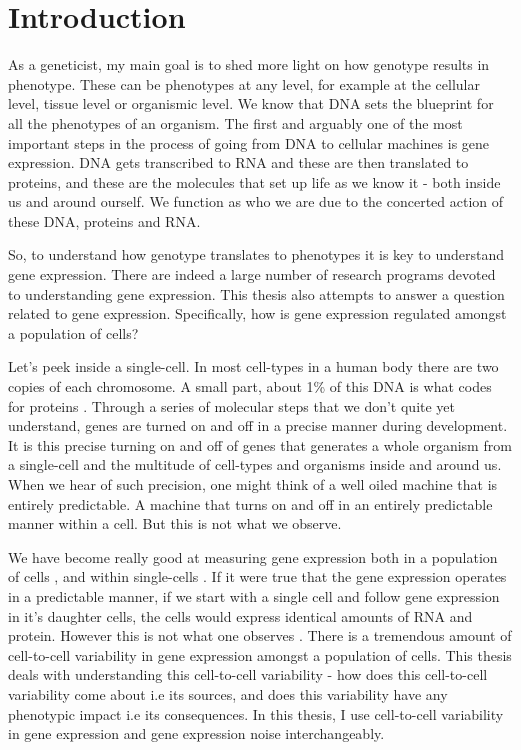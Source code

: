 \chapter{Introduction}
\label{chap:introduction}
\tightlists

As a geneticist, my main goal is to shed more light on how genotype results in phenotype. These can be phenotypes at any level, for example at the cellular level, tissue level or organismic level. We know that DNA sets the blueprint for all the phenotypes of an organism. The first and arguably one of the most important steps in the process of going from DNA to cellular machines is gene expression. DNA gets transcribed to RNA and these are then translated to proteins, and these are the molecules that set up life as we know it - both inside us and around ourself. We function as who we are due to the concerted action of these DNA, proteins and RNA.

So, to understand how genotype translates to phenotypes it is key to understand gene expression. There are indeed a large number of research programs devoted to understanding gene expression. This thesis also attempts to answer a question related to gene expression. Specifically, how is gene expression regulated amongst a population of cells?

Let's peek inside a single-cell. In most cell-types in a human body there are two copies of each chromosome. A small part, about 1\% of this DNA is what codes for proteins \cite {lander2001n}. Through a series of molecular steps that we don't quite yet understand, genes are turned on and off in a precise manner during development. It is this precise turning on and off of genes that generates a whole organism from a single-cell and the multitude of cell-types and organisms inside and around us. When we hear of such precision, one might think of a well oiled machine that is entirely predictable. A machine that turns on and off in an entirely predictable manner within a cell. But this is not what we observe.

We have become really good at measuring gene expression both in a population of cells \cite{griffith2015pcb}, and within single-cells \cite{macosko2015c, newman2006na, xia2019pnasu, raj2006pb}. If it were true that the gene expression operates in a predictable manner, if we start with a single cell and follow gene expression in it's daughter cells, the cells would express identical amounts of RNA and protein. However this is not what one observes \cite{elowitz_stochastic_2002}. There is a tremendous amount of cell-to-cell variability in gene expression amongst a population of cells. This thesis deals with understanding this cell-to-cell variability - how does this cell-to-cell variability come about i.e its sources, and does this variability have any phenotypic impact i.e its consequences. In this thesis, I use cell-to-cell variability in gene expression and gene expression noise interchangeably.

